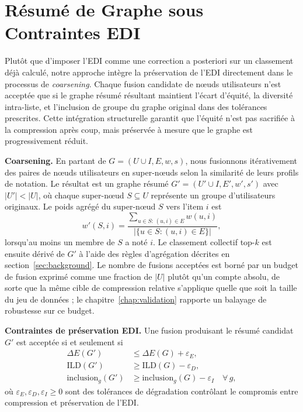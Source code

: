 \documentclass[12pt]{report}
\begin{document}
\section{Résumé de Graphe sous Contraintes EDI}

Plutôt que d'imposer l'EDI comme une correction a posteriori sur un
classement déjà calculé, notre approche intègre la préservation de l'EDI
directement dans le processus de \emph{coarsening}. Chaque fusion
candidate de nœuds utilisateurs n'est acceptée que si le graphe résumé
résultant maintient l'écart d'équité, la diversité intra-liste, et
l'inclusion de groupe du graphe original dans des tolérances prescrites.
Cette intégration structurelle garantit que l'équité n'est pas sacrifiée
à la compression après coup, mais préservée à mesure que le graphe est
progressivement réduit.

\smallskip\noindent\textbf{Coarsening.}
En partant de $G = (U \cup I, E, w, s)$, nous fusionnons itérativement des
paires de nœuds utilisateurs en super-nœuds selon la similarité de leurs
profils de notation. Le résultat est un graphe résumé $G' = (U' \cup I,
E', w', s')$ avec $|U'| < |U|$, où chaque super-nœud $S \subseteq U$
représente un groupe d'utilisateurs originaux. Le poids agrégé du
super-nœud $S$ vers l'item $i$ est
\begin{equation}
  w'(S, i) =
    \frac{\displaystyle\sum_{u \in S:\,(u,i)\in E} w(u,i)}
         {|\{u \in S : (u,i) \in E\}|},
\end{equation}
lorsqu'au moins un membre de $S$ a noté $i$. Le classement collectif
top-$k$ est ensuite dérivé de $G'$ à l'aide des règles d'agrégation
décrites en section~\ref{sec:background}. Le nombre de fusions acceptées
est borné par un budget de fusion exprimé comme une fraction de $|U|$
plutôt qu'un compte absolu, de sorte que la même cible de compression
relative s'applique quelle que soit la taille du jeu de données ; le
chapitre~\ref{chap:validation} rapporte un balayage de robustesse
sur ce budget.

\smallskip\noindent\textbf{Contraintes de préservation EDI.}
Une fusion produisant le résumé candidat $G'$ est acceptée si et
seulement si
\begin{align}
  \Delta E(G') &\leq \Delta E(G) + \varepsilon_E, \\
  \mathrm{ILD}(G') &\geq \mathrm{ILD}(G) - \varepsilon_D, \\
  \mathrm{inclusion}_g(G') &\geq \mathrm{inclusion}_g(G) - \varepsilon_I
  \quad \forall\, g,
\end{align}
où $\varepsilon_E, \varepsilon_D, \varepsilon_I \geq 0$ sont des
tolérances de dégradation contrôlant le compromis entre compression et
préservation de l'EDI.
\end{document}
